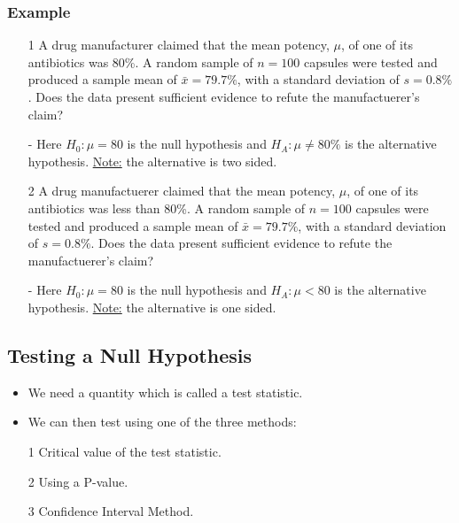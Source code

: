 \documentclass[12pt, letterpaper]{article}
\begin{document}
            \subsubsection*{Example}
                \begin{itemize}
                    \item[1] A drug manufacturer claimed that the mean potency, $\mu$, of one of its antibiotics was 80\%. A random sample of $n = 100$ capsules were tested and produced a sample mean of $\bar{x} = 79.7\%$, with a standard deviation of $s = 0.8\%$. Does the data present sufficient evidence to refute the manufactuerer's claim?
                    \item[-] Here $H_0 : \mu = 80$ is the null hypothesis and $H_A : \mu \neq 80\%$ is the alternative hypothesis. \underline{Note:} the alternative is two sided.
                    \item[2] A drug manufactuerer claimed that the mean potency, $\mu$, of one of its antibiotics was less than 80\%. A random sample of $n = 100$ capsules were tested and produced a sample mean of $\bar{x} = 79.7\%$, with a standard deviation of $s = 0.8\%$. Does the data present sufficient evidence to refute the manufactuerer's claim?
                    \item[-] Here $H_0 : \mu = 80$ is the null hypothesis and $H_A : \mu < 80$ is the alternative hypothesis. \underline{Note:} the alternative is one sided. 
                \end{itemize}
        \subsection{Testing a Null Hypothesis}
            \begin{itemize}
                \item We need a quantity which is called a test statistic.
                \item We can then test using one of the three methods:
                \item[1] Critical value of the test statistic.
                \item[2] Using a P-value. 
                \item[3] Confidence Interval Method.
            \end{itemize}
\end{document}
